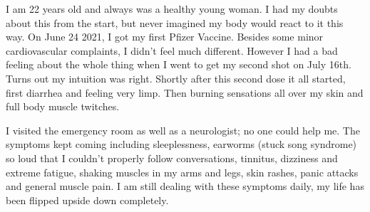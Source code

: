 I am 22 years old and always was a healthy young woman. I had my doubts about
this from the start, but never imagined my body would react to it this way. On
June 24 2021, I got my first Pfizer Vaccine. Besides some minor cardiovascular
complaints, I didn't feel much different. However I had a bad feeling about the
whole thing when I went to get my second shot on July 16th. Turns out my
intuition was right. Shortly after this second dose it all started, first
diarrhea and feeling very limp. Then burning sensations all over my skin and
full body muscle twitches.

I visited the emergency room as well as a neurologist; no one could help me. The
symptoms kept coming including sleeplessness, earworms (stuck song syndrome) so
loud that I couldn't properly follow conversations, tinnitus, dizziness and
extreme fatigue, shaking muscles in my arms and legs, skin rashes, panic attacks
and general muscle pain. I am still dealing with these symptoms daily,
my life has been flipped upside down completely.


